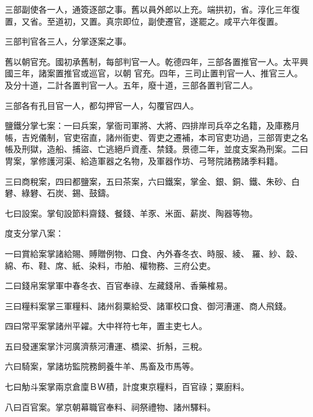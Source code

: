 \begin{pinyinscope}
 三部副使各一人，通簽逐部之事。舊以員外郎以上充。端拱初，省。淳化三年復置，又省。至道初，又置。真宗即位，副使遷官，遂罷之。咸平六年復置。



 三部判官各三人，分掌逐案之事。



 舊以朝官充。國初承舊制，每部判官一人。乾德四年，三部各置推官一人。太平興國三年，諸案置推官或巡官，以朝
 官充。四年，三司止置判官一人、推官三人。及分十道，二計各置判官一人。五年，廢十道，三部各置判官二人。



 三部各有孔目官一人，都勾押官一人，勾覆官四人。



 鹽鐵分掌七案：一曰兵案，掌衙司軍將、大將、四排岸司兵卒之名籍，及庫務月帳，吉兇儀制，官吏宿直，諸州衙吏、胥吏之遷補，本司官吏功過，三部胥吏之名帳及刑獄，造船、捕盜、亡逃絕戶資產、禁錢。景德二年，並度支案為刑案。二曰冑案，掌修護河渠、給造軍器之名物，及軍器作坊、弓弩院諸務諸季料籍。



 三曰商稅案，四曰都鹽案，五曰茶案，六曰鐵案，掌金、銀、銅、鐵、朱砂、白礬、綠礬、石炭、錫、鼓鑄。



 七曰設案。掌旬設節料齋錢、餐錢、羊豕、米面、薪炭、陶器等物。



 度支分掌八案：



 一曰賞給案掌諸給賜、賻贈例物、口食、內外春冬衣、時服、綾、
 羅、紗、縠、綿、布、鞋、席、紙、染料，市舶、權物務、三府公吏。



 二曰錢帛案掌軍中春冬衣、百官奉祿、左藏錢帛、香藥榷易。



 三曰糧料案掌三軍糧料、諸州芻粟給受、諸軍校口食、御河漕運、商人飛錢。



 四曰常平案掌諸州平糴。大中祥符七年，置主吏七人。



 五曰發運案掌汴河廣濟蔡河漕運、橋梁、折斛，三稅。



 六曰騎案，掌諸坊監院務飼養牛羊、馬畜及市馬等。



 七曰觔斗案掌兩京倉廩ＢＷ積，計度東京糧料，百官祿；粟廚料。



 八曰百官案。掌京朝幕職官奉料、祠祭禮物、諸州驛料。




\end{pinyinscope}
